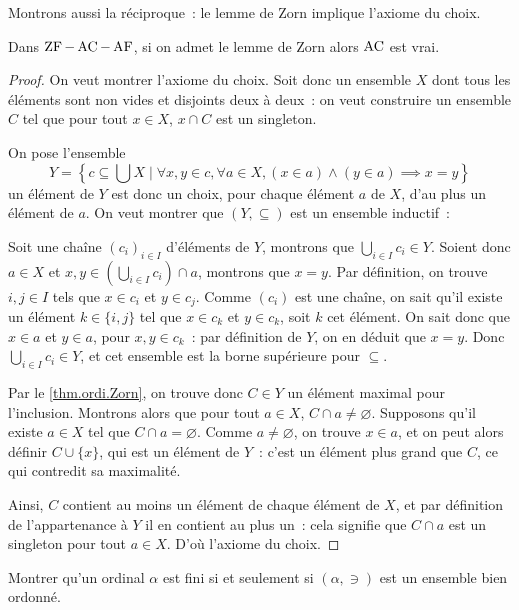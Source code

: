 Montrons aussi la réciproque~: le lemme de Zorn implique l'axiome du choix.

\begin{proposition}
  Dans $\operatorname{ZF} - \operatorname{AC} - \operatorname{AF}$, si on admet le lemme de Zorn alors $\operatorname{AC}$ est vrai.
\end{proposition}

\begin{proof}
  On veut montrer l'axiome du choix. Soit donc un ensemble $X$ dont tous les
  éléments sont non vides et disjoints deux à deux~: on veut construire un
  ensemble $C$ tel que pour tout $x \in X$, $x\cap C$ est un singleton.

  On pose l'ensemble
  \[Y = \left\{c \subseteq \bigcup X\;\Big|\; \forall x,y \in c,
  \forall a \in X, (x \in a)\land (y \in a) \implies x = y\right\}\]
  un élément de $Y$ est donc un choix, pour chaque élément $a$ de $X$, d'au plus
  un élément de $a$. On veut montrer que $(Y,\subseteq)$ est un ensemble
  inductif~:

  Soit une chaîne $(c_i)_{i\in I}$ d'éléments de $Y$, montrons que
  $\displaystyle\bigcup_{i\in I} c_i\in Y$. Soient donc $a\in X$ et
  $x,y\in\displaystyle\left(\bigcup_{i \in I} c_i\right) \cap a$, montrons que
  $x = y$. Par définition, on trouve $i,j \in I$ tels que $x \in c_i$ et
  $y\in c_j$. Comme $(c_i)$ est une chaîne, on sait qu'il existe un élément
  $k\in\{i,j\}$ tel que $x\in c_k$ et $y\in c_k$, soit $k$ cet élément. On sait
  donc que $x\in a$ et $y\in a$, pour $x,y\in c_k$~: par définition de $Y$, on
  en déduit que $x = y$. Donc $\displaystyle\bigcup_{i\in I} c_i\in Y$, et
  cet ensemble est la borne supérieure pour $\subseteq$.

  Par le \cref{thm.ordi.Zorn}, on trouve donc $C \in Y$ un élément maximal pour
  l'inclusion. Montrons alors que pour tout $a \in X$,
  $C \cap a \neq\varnothing$. Supposons qu'il existe $a \in X$ tel que
  $C\cap a = \varnothing$. Comme $a\neq\varnothing$, on trouve $x \in a$, et
  on peut alors définir $C \cup \{x\}$, qui est un élément de $Y$~: c'est un
  élément plus grand que $C$, ce qui contredit sa maximalité.

  Ainsi, $C$ contient au moins un élément de chaque élément de $X$, et par
  définition de l'appartenance à $Y$ il en contient au plus un~: cela signifie
  que $C\cap a$ est un singleton pour tout $a \in X$. D'où l'axiome du choix.
\end{proof}

\begin{exercise}
  Montrer qu'un ordinal $\alpha$ est fini si et seulement si $(\alpha,\ni)$ est
  un ensemble bien ordonné.
\end{exercise}

